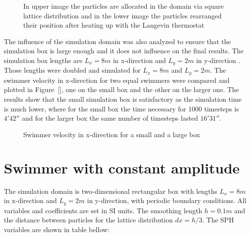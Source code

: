 \begin{figure}[H]
\centering
  \begin{footnotesize}
  
  \caption[In upper image the particles are allocated in the domain via square lattice distribution and in the lower image the particles rearranged their position after heating up with the  Langevin thermostat]{In upper image the particles are allocated in the domain via square lattice distribution and in the lower image the particles rearranged their position after heating up with the  Langevin thermostat}
  \label{fig:Bild4.2}
  \end{footnotesize}
\end{figure} 


The influence of the simulation domain was also analyzed to ensure that the simulation box is large enough and it does not influence on the final results. The simulation box 
lengths are $L_{x}= 8m$ in x-direction and $L_{y}=2m$ in y-direction . Those lengths were doubled and simulated for $L_{x}= 8m$ and $L_{y}=2m$. The swimmer velocity in x-direction
for two equal swimmers were compared and plotted in Figure~\ref{}, one on the small box and the other on the larger one. The results show that the small simulation box is 
satisfactory as the simulation time is much lower, where for the small box the time necessary for 1000 timesteps is $4'42''$ and for the larger box the same number of timesteps
lasted $16'31''$.


\begin{figure}[H]
\centering
  \begin{footnotesize}
  
  \caption[]{Swimmer velocity in x-direction for a small and a large box }
  \label{fig:Bild4.3}
  \end{footnotesize}
\end{figure} 


\section{Swimmer with constant amplitude}
\label{sec:section 3}

The simulation domain is two-dimensional rectangular box with lengths $L_{x}= 8m$ in x-direction and $L_{y}=2m$ in y-direction, with periodic boundary conditions. All variables
and coefficients are set in SI units. The smoothing length $h=0.1m$ and the distance between particles for the lattice distribution $dx=h/3$. The SPH variables are shown in
table bellow:
\par



